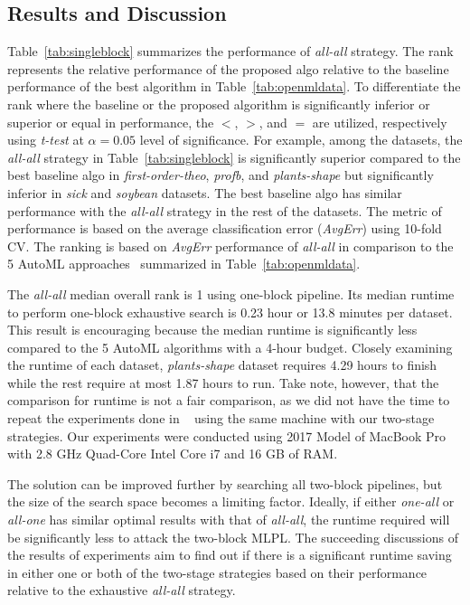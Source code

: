 \documentclass{juliacon}
\begin{document}
\subsection{Results and Discussion}



Table~\ref{tab:singleblock} summarizes the performance of \emph{all-all}
strategy. The rank represents the relative performance of the proposed algo
relative to the baseline performance of the best algorithm in Table~\ref{tab:openmldata}.
To differentiate the rank where the baseline 
or the proposed algorithm is significantly inferior or superior or equal in performance, the $<$, $>$, and $=$ are utilized, respectively using \emph{t-test} at $\alpha=0.05$ level of significance. 
For example,  among the datasets, the \emph{all-all} strategy in Table~\ref{tab:singleblock}
is significantly superior compared to the best baseline algo in \emph{first-order-theo}, \emph{profb}, and \emph{plants-shape} but significantly inferior in \emph{sick} and \emph{soybean} datasets. The best baseline algo has similar performance with the \emph{all-all} strategy in the rest of the datasets. 
The metric of performance is based on the average classification
error (\emph{AvgErr}) using 10-fold CV. The ranking is based on 
\emph{AvgErr} performance of \emph{all-all} in comparison to the 
5 AutoML approaches~\cite{zoller2019} summarized in Table~\ref{tab:openmldata}.

\vskip 6pt

The \emph{all-all} median overall rank is 1 using one-block pipeline.
Its median runtime to perform one-block exhaustive search is 0.23 hour or 13.8 minutes per dataset.
This result is encouraging because the median runtime is significantly less
compared to the 5 AutoML algorithms with a 4-hour budget.  Closely examining 
the runtime of each dataset, \emph{plants-shape} dataset
requires 4.29 hours to finish while
the rest require at most 1.87 hours to run. Take note, however, that the
comparison for runtime is not a fair comparison, as we did not have the time to repeat the experiments done in ~\cite{zoller2019}
using the same machine with our two-stage strategies. 
Our experiments were conducted using 2017 Model of MacBook Pro with 2.8 GHz Quad-Core Intel Core i7 and 16 GB of RAM.

\vskip 6pt

The solution can be improved further by searching all two-block pipelines,
but the size of the search space becomes a limiting factor. Ideally, if either
\emph{one-all} or \emph{all-one} has similar optimal results with that of
\emph{all-all}, the runtime required will be significantly less to attack
the two-block MLPL.  The succeeding discussions of the results of
experiments aim to find out if there is a significant runtime
saving in either one or both of the two-stage strategies based
on their performance relative to the exhaustive \emph{all-all}
strategy.
\end{document}
